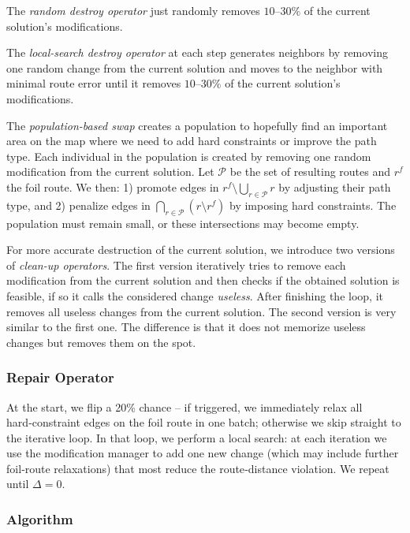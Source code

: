 \documentclass{article}
\begin{document}
The \textit{random destroy operator} just randomly removes $10$--$30\%$ of the current solution’s modifications. 

The \textit{local-search destroy operator} at each step generates neighbors by removing one random change from the current solution and moves to the neighbor with minimal route error until it removes $10$--$30\%$ of the current solution’s modifications. 

The \textit{population-based swap} creates a population to hopefully find an important area on the map where we need to add hard constraints or improve the path type. Each individual in the population is created by removing one random modification from the current solution. Let $\mathcal{P}$ be the set of resulting routes and $r^f$ the foil route. We then: 1) promote edges in 
  \(
    r^f \setminus \bigcup_{r \in \mathcal{P}} r
  \)
  by adjusting their path type, and 2) penalize edges in 
  \(
    \bigcap_{r \in \mathcal{P}} \left(r \setminus r^f\right)
  \)
  by imposing hard constraints. The population must remain small, or these intersections may become empty.

For more accurate destruction of the current solution, we introduce two versions of \textit{clean-up operators}. The first version iteratively tries to remove each modification from the current solution and then checks if the obtained solution is feasible, if so it calls the considered change \textit{useless}. After finishing the loop, it removes all useless changes from the current solution. The second version is very similar to the first one. The difference is that it does not memorize useless changes but removes them on the spot.

\subsubsection{Repair Operator}

At the start, we flip a 20\% chance -- if triggered, we immediately relax all hard‑constraint edges on the foil route in one batch; otherwise we skip straight to the iterative loop.  In that loop, we perform a local search: at each iteration we use the modification manager to add one new change (which may include further foil‑route relaxations) that most reduce the route‑distance violation.  We repeat until $\Delta=0$.

\subsubsection{Algorithm}
\end{document}
